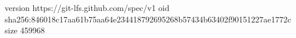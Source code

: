 version https://git-lfs.github.com/spec/v1
oid sha256:846018c17aa61b75aa64e234418792695268b57434b63402f90151227ae1772c
size 459968
